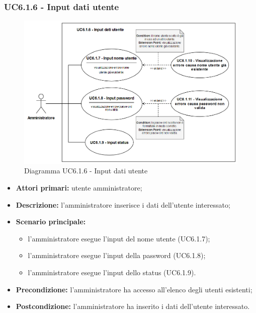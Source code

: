 \subsubsection{UC6.1.6 - Input dati utente}
	\begin{figure}[H]
		\centering
		\includegraphics[width=15cm]{images/UC6.1.6.png}
		\caption{Diagramma UC6.1.6 - Input dati utente}
	\end{figure}
	\begin{itemize}
		\item \textbf{Attori primari:} utente amministratore;
		\item \textbf{Descrizione:} l'amministratore inserisce i dati dell'utente interessato;
		\item \textbf{Scenario principale:} 
			\begin{itemize}
				\item l'amministratore esegue l'input del nome utente (UC6.1.7);
				\item l'amministratore esegue l'input della password (UC6.1.8);
				\item l'amministratore esegue l'input dello status (UC6.1.9).
			\end{itemize}
		\item \textbf{Precondizione:} l'amministratore ha accesso all'elenco degli utenti esistenti;
		\item \textbf{Postcondizione:} l'amministratore ha inserito i dati dell'utente interessato.
	\end{itemize}

